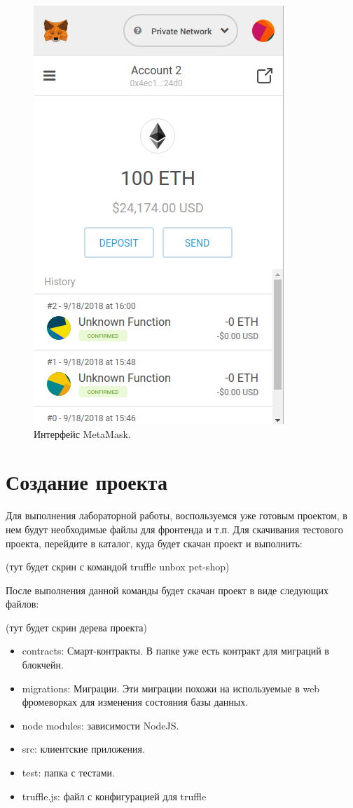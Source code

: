 \documentclass{article}
\begin{document}
\begin{figure}
    \centering
    \includegraphics[scale=0.4]{metamask_1}
    \caption{Интерфейс MetaMask.}
    \label{fig:metamask_1}
\end{figure}


\section{Создание проекта}

Для выполнения лабораторной работы, воспользуемся уже готовым проектом, в нем будут необходимые файлы для фронтенда и т.п. Для скачивания тестового проекта, перейдите в каталог, куда будет скачан проект и выполнить:

(тут будет скрин с командой  truffle unbox pet-shop)

После выполнения данной команды будет скачан проект в виде следующих файлов:

(тут будет скрин дерева проекта)


\begin{itemize}
	\item contracts:  Смарт-контракты. В папке уже есть контракт для миграций в блокчейн.
	\item migrations: Миграции. Эти миграции похожи на используемые в web фромеворках для изменения состояния базы данных.
	\item node modules: зависимости NodeJS.
	\item src: клиентские приложения.
	\item test: папка с тестами.
	\item truffle.js: файл с конфигурацией для truffle
\end{itemize}
\end{document}
